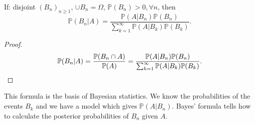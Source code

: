\begin{corollary}\label{thm:Bayes' formula}
    If: disjoint $ (B_n)_{n\ge 1} $, $ \cup B_n=\Omega $, $ \mathbb{P}(B_n)>0, \forall n $, then 
    \[
        \mathbb{P}(B_n|A) = \frac{\mathbb{P}(A|B_n)\mathbb{P}(B_n)}{\sum_{k=1}^{\infty}\mathbb{P}(A|B_k)\mathbb{P}(B_k)}.
    \]
\end{corollary}
\begin{proof}
    \[
        \mathbb{P}(B_n|A) = \frac{{\mathbb{P}}(B_n\cap A)}{{\mathbb{P}}(A)}= \frac{\mathbb{P}(A|B_n)\mathbb{P}(B_n)}{\sum_{k=1}^{\infty}\mathbb{P}(A|B_k)\mathbb{P}(B_k)}.
    \]
\end{proof}
This formula is the basis of Bayesian statistics. We know the probabilities of the events $ B_k $ and we have a model which gives $ \mathbb{P}(A|B_n) $. Bayes' formula tells how to calculate the posterior probabilities of $ B_n $ given $A$.

